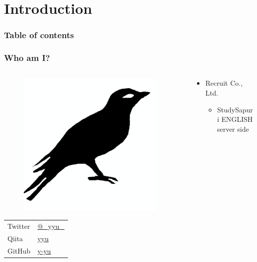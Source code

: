 \section{Introduction}

\begin{frame}
  \frametitle{Table of contents}

  \tableofcontents
\end{frame}

\begin{frame}
  \frametitle{Who am I?}
  
  \begin{columns}
    \begin{column}{0.3\textwidth}
      \begin{center}
        \begin{figure}
          \includegraphics[width=0.95\textwidth]{img/bird2x.png}
        \end{figure}
      \end{center}
 
      \begin{table}[h]
        \begin{tabular}{ll}
          Twitter & \href{https://twitter.com/\_yyu\_}{@\_yyu\_} \\
          Qiita &  \href{https://qiita.com/yyu}{yyu} \\
          GitHub &  \href{https://github.com/y-yu}{y-yu} \\
        \end{tabular}
      \end{table}
    \end{column}
    \begin{column}{0.7\textwidth}
      \begin{itemize}
        \item Recruit Co., Ltd.
        \begin{itemize}
          \item StudySapuri ENGLISH server side
        \end{itemize}


\end{itemize}
\end{column}
\end{columns}
\end{frame}
